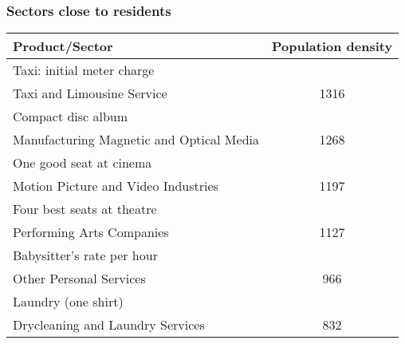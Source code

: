 \documentclass[compress,mathserif]{beamer}
\begin{document}
\begin{frame}\frametitle{Sectors close to residents}
\begin{center}
\begin{tabular}{lc}
  \hline
  Product/Sector & Population density \\
  \hline
  Taxi: initial meter charge\\
  \hspace*{1em}Taxi and Limousine Service & 1316\\
  Compact disc album\\
  \hspace*{1em}Manufacturing Magnetic and Optical Media&1268\\
  One good seat at cinema\\
  \hspace*{1em}Motion Picture and Video Industries & 1197\\
  Four best seats at theatre\\
  \hspace*{1em}Performing Arts Companies & 1127\\
  Babysitter's rate per hour\\
  \hspace*{1em}Other Personal Services & 966\\
  Laundry (one shirt)\\
  \hspace*{1em}Drycleaning and Laundry Services & 832\\
  \hline
\end{tabular}
\end{center}
\end{frame}
\end{document}
